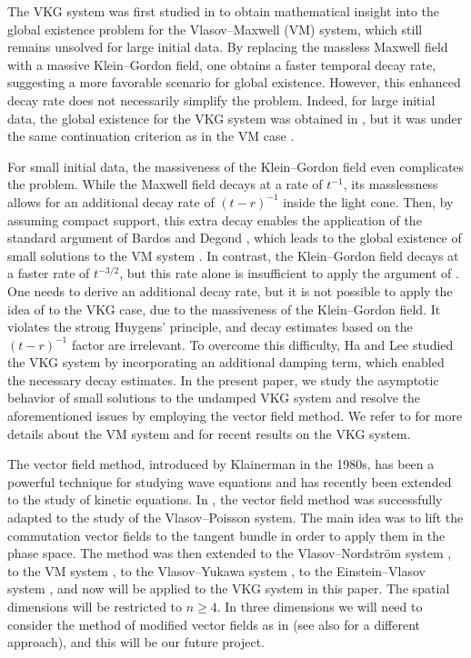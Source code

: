 \documentclass{article}
\begin{document}
The VKG system was first studied in \cite{KRST03, KRST05} to obtain mathematical insight into the global existence problem for the Vlasov--Maxwell (VM) system, which still remains unsolved for large initial data. By replacing the massless Maxwell field with a massive Klein--Gordon field, one obtains a faster temporal decay rate, suggesting a more favorable scenario for global existence. However, this enhanced decay rate does not necessarily simplify the problem. Indeed, for large initial data, the global existence for the VKG system was obtained in \cite{KRST05}, but it was under the same continuation criterion as in the VM case \cite{GS86}.


For small initial data, the massiveness of the Klein--Gordon field even complicates the problem. While the Maxwell field decays at a rate of $ t^{ - 1 } $, its masslessness allows for an additional decay rate of $ ( t - r )^{ - 1 } $ inside the light cone. Then, by assuming compact support, this extra decay enables the application of the standard argument of Bardos and Degond \cite{BD85}, which leads to the global existence of small solutions to the VM system \cite{GS87}. In contrast, the Klein--Gordon field decays at a faster rate of $ t^{ - 3 / 2 } $, but this rate alone is insufficient to apply the argument of \cite{BD85}. One needs to derive an additional decay rate, but it is not possible to apply the idea of \cite{GS87} to the VKG case, due to the massiveness of the Klein--Gordon field. It violates the strong Huygens' principle, and decay estimates based on the $ ( t - r )^{ - 1 } $ factor are irrelevant. To overcome this difficulty, Ha and Lee \cite{HL09} studied the VKG system by incorporating an additional damping term, which enabled the necessary decay estimates. In the present paper, we study the asymptotic behavior of small solutions to the undamped VKG system and resolve the aforementioned issues by employing the vector field method. We refer to \cite{Gl, GSc97, GS86, GS87, LS14, LS16, P05, P15, S04} for more details about the VM system and \cite{N24a, XZ18, XZ19} for recent results on the VKG system.


The vector field method, introduced by Klainerman in the 1980s, has been a powerful technique for studying wave equations and has recently been extended to the study of kinetic equations. In \cite{S16}, the vector field method was successfully adapted to the study of the Vlasov--Poisson system. The main idea was to lift the commutation vector fields to the tangent bundle in order to apply them in the phase space. The method was then extended to the Vlasov--Nordstr{\"o}m system \cite{FJS17, FJS17a}, to the VM system \cite{B20, B21, B22}, to the Vlasov--Yukawa system \cite{D22}, to the Einstein--Vlasov system \cite{BFJST21, FJS21}, and now will be applied to the VKG system in this paper. The spatial dimensions will be restricted to $ n \geq 4 $. In three dimensions we will need to consider the method of modified vector fields as in \cite{B20, FJS17a, S16} (see also \cite{N24a} for a different approach), and this will be our future project. 
\end{document}
